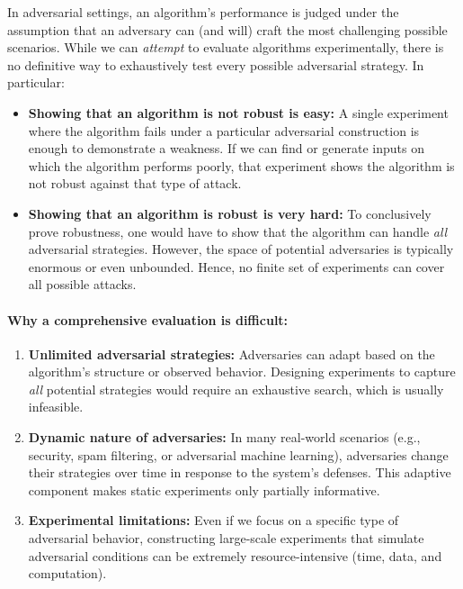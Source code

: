 In adversarial settings, an algorithm's performance is judged under the assumption that an adversary can (and will) craft the most challenging possible scenarios. While we can \emph{attempt} to evaluate algorithms experimentally, there is no definitive way to exhaustively test every possible adversarial strategy. In particular:

\begin{itemize}
    \item \textbf{Showing that an algorithm is not robust is easy:} 
    A single experiment where the algorithm fails under a particular adversarial construction is enough to demonstrate a weakness. If we can find or generate inputs on which the algorithm performs poorly, that experiment shows the algorithm is not robust against that type of attack.

    \item \textbf{Showing that an algorithm is robust is very hard:}
    To conclusively prove robustness, one would have to show that the algorithm can handle \emph{all} adversarial strategies. However, the space of potential adversaries is typically enormous or even unbounded. Hence, no finite set of experiments can cover all possible attacks.

\end{itemize}

\paragraph{Why a comprehensive evaluation is difficult:}
\begin{enumerate}
    \item \textbf{Unlimited adversarial strategies:} 
    Adversaries can adapt based on the algorithm’s structure or observed behavior. Designing experiments to capture \emph{all} potential strategies would require an exhaustive search, which is usually infeasible.

    \item \textbf{Dynamic nature of adversaries:}
    In many real-world scenarios (e.g., security, spam filtering, or adversarial machine learning), adversaries change their strategies over time in response to the system's defenses. This adaptive component makes static experiments only partially informative.

    \item \textbf{Experimental limitations:}
    Even if we focus on a specific type of adversarial behavior, constructing large-scale experiments that simulate adversarial conditions can be extremely resource-intensive (time, data, and computation).
\end{enumerate}

